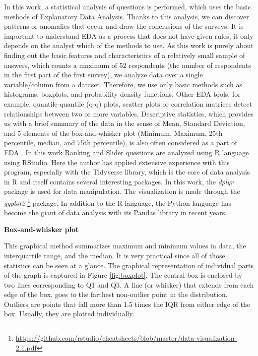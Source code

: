 \documentclass[a4paper,10pt,twoside]{article}
\begin{document}
\noindent In this work, a statistical analysis of questions is performed, which uses the basic methods of Explanatory Data Analysis. Thanks to this analysis, we can discover patterns or anomalies that occur and draw the conclusions of the surveys. It is important to understand EDA as a process that does not have given rules, it only depends on the analyst which of the methods to use. As this work is purely about finding out the basic features and characteristics of a relatively small sample of answers, which counts a maximum of 52 respondents (the number of respondents in the first part of the first survey), we analyze data over a single variable/column from a dataset. Therefore, we use only basic methods such as histograms, boxplots, and probability density functions. Other EDA tools, for example, quantile-quantile (q-q) plots, scatter plots or correlation matrices detect relationships between two or more variables. Descriptive statistics, which provides us with a brief summary of the data in the sense of Mean, Standard Deviation, and 5 elements of the box-and-whisker plot (Minimum, Maximum, 25th percentile, median, and 75th percentile), is also often considered as a part of EDA \cite{heroku} \cite{luminousmen}. In this work Ranking and Slider questions are analyzed using R language using RStudio. Here the author has applied extensive experience with this program, especially with the Tidyverse library, which is the core of data analysis in R and itself contains several interesting packages. In this work, the \textit{dplyr} package is used for data manipulation. The visualization is made through the \textit{ggplot2} \footnote{\url{https://github.com/rstudio/cheatsheets/blob/master/data-visualization-2.1.pdf}} package. In addition to the R language, the Python language has become the giant of data analysis with its Pandas library in recent years.

\bigskip
\noindent \textbf{Box-and-whisker plot}

\noindent This graphical method summarizes maximum and minimum values in data, the interquartile range, and the median. It is very practical since all of those statistics can be seen at a glance. The graphical representation of individual parts of the graph is captured in Figure \ref{fig:boxplot}. The central box is enclosed by two lines corresponding to Q1 and Q3. A line (or whisker) that extends from each edge of the box, goes to the farthest non-outlier point in the distribution. Outliers are points that fall more than 1.5 times the IQR from either edge of the box. Usually, they are plotted individually.
\end{document}
